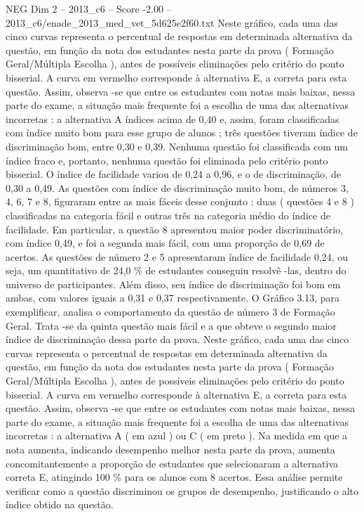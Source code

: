 \begin{textsample}{NEG Dim 2 – 2013\_c6 – Score -2.00 – 2013\_c6/enade\_2013\_med\_vet\_5d625e2f60.txt}
Neste gráfico, cada uma das cinco curvas representa o percentual de respostas em determinada alternativa da questão, em função da nota dos estudantes nesta parte da prova ( Formação Geral/Múltipla Escolha ), antes de possíveis eliminações pelo critério do ponto bisserial.
A curva em vermelho corresponde à alternativa E, a correta para esta questão.
Assim, observa -se que entre os estudantes com notas mais baixas, nessa parte do exame, a situação mais frequente foi a escolha de uma das alternativas incorretas : a alternativa A índices acima de 0,40 e, assim, foram classificadas com índice muito bom para esse grupo de alunos ; três questões tiveram índice de discriminação bom, entre 0,30 e 0,39.
Nenhuma questão foi classificada com um índice fraco e, portanto, nenhuma questão foi eliminada pelo critério ponto bisserial.
O índice de facilidade variou de 0,24 a 0,96, e o de discriminação, de 0,30 a 0,49.
As questões com índice de discriminação muito bom, de números 3, 4, 6, 7 e 8, figuraram entre as mais fáceis desse conjunto : duas ( questões 4 e 8 ) classificadas na categoria fácil e outras três na categoria médio do índice de facilidade.
Em particular, a questão 8 apresentou maior poder discriminatório, com índice 0,49, e foi a segunda mais fácil, com uma proporção de 0,69 de acertos.
As questões de número 2 e 5 apresentaram índice de facilidade 0,24, ou seja, um quantitativo de 24,0 \% de estudantes conseguiu resolvê -las, dentro do universo de participantes.
Além disso, seu índice de discriminação foi bom em ambas, com valores iguais a 0,31 e 0,37 respectivamente.
O Gráfico 3.13, para exemplificar, analisa o comportamento da questão de número 3 de Formação Geral.
Trata -se da quinta questão mais fácil e a que obteve o segundo maior índice de discriminação dessa parte da prova.
Neste gráfico, cada uma das cinco curvas representa o percentual de respostas em determinada alternativa da questão, em função da nota dos estudantes nesta parte da prova ( Formação Geral/Múltipla Escolha ), antes de possíveis eliminações pelo critério do ponto bisserial.
A curva em vermelho corresponde à alternativa E, a correta para esta questão.
Assim, observa -se que entre os estudantes com notas mais baixas, nessa parte do exame, a situação mais frequente foi a escolha de uma das alternativas incorretas : a alternativa A ( em azul ) ou C ( em preto ).
Na medida em que a nota aumenta, indicando desempenho melhor nesta parte da prova, aumenta concomitantemente a proporção de estudantes que selecionaram a alternativa correta E, atingindo 100 \% para os alunos com 8 acertos.
Essa análise permite verificar como a questão discriminou os grupos de desempenho, justificando o alto índice obtido na questão.

\end{textsample}
